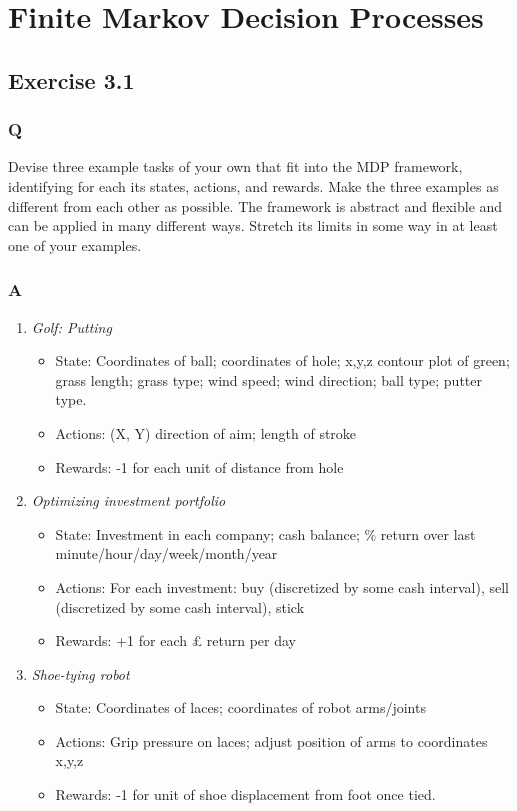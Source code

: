 \section{Finite Markov Decision Processes}
\subsection{Exercise 3.1}
\subsubsection*{Q}
Devise three example tasks of your own that fit into the MDP framework, identifying for each its states, actions, and rewards. Make the three examples as different from each other as possible. The framework is abstract and flexible and can be applied in many different ways. Stretch its limits in some way in at least one of your examples.

\subsubsection*{A}
\begin{enumerate}
	\item \textit{Golf: Putting}
	\begin{itemize}
		\item State: Coordinates of ball; coordinates of hole; x,y,z contour plot of green; grass length; grass type; wind speed; wind direction; ball type; putter type.
		\item Actions: (X, Y) direction of aim; length of stroke
		\item Rewards: -1 for each unit of distance from hole
	\end{itemize}
	\item \textit{Optimizing investment portfolio}
	\begin{itemize}
		\item State: Investment in each company; cash balance; \% return over last minute/hour/day/week/month/year
		\item Actions: For each investment: buy (discretized by some cash interval), sell (discretized by some cash interval), stick
		\item Rewards: +1 for each £ return per day 
	\end{itemize}
	\item \textit{Shoe-tying robot}
	\begin{itemize}
		\item State: Coordinates of laces; coordinates of robot arms/joints
		\item Actions: Grip pressure on laces; adjust position of arms to coordinates x,y,z
		\item Rewards: -1 for unit of shoe displacement from foot once tied.
	\end{itemize}
\end{enumerate}


